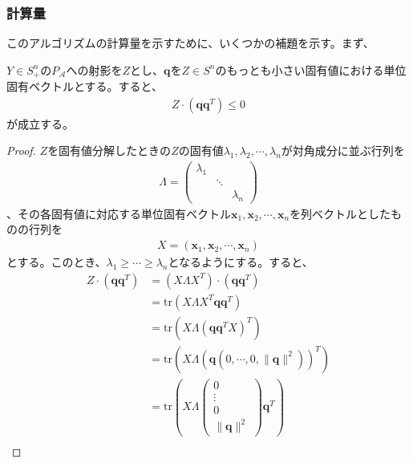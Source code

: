 \subsubsection{計算量}
このアルゴリズムの計算量を示すために、いくつかの補題を示す。まず、
\begin{lemma} \label{NegativeInnerProduct}
  $Y \in S_+^n$の$P_\mathcal{A}$への射影を$Z$とし、$\mathbf{q}$を$Z \in S^n$のもっとも小さい固有値における単位固有ベクトルとする。すると、
  \begin{align*}
    Z \cdot (\mathbf{q} \mathbf{q}^T) \leq 0
  \end{align*}
  が成立する。
\end{lemma}
\begin{proof}
  $Z$を固有値分解したときの$Z$の固有値$\lambda_1, \lambda_2, \cdots, \lambda_n$が対角成分に並ぶ行列を
  \begin{align*}
    \Lambda = \left(
                \begin{array}{ccc}
                  \lambda_1 &        & \\
                            & \ddots & \\
                            &        & \lambda_n
                \end{array}
              \right)
  \end{align*}
  、その各固有値に対応する単位固有ベクトル$\mathbf{x}_1, \mathbf{x}_2, \cdots, \mathbf{x}_n$を列ベクトルとしたものの行列を
  \begin{align*}
    X = \left(\mathbf{x}_1, \mathbf{x}_2, \cdots, \mathbf{x}_n\right)
  \end{align*}
  とする。このとき、$\lambda_1 \geq \cdots \geq \lambda_n$となるようにする。すると、
  \begin{align*}
    Z \cdot (\mathbf{q} \mathbf{q}^T) & = (X \Lambda X^T) \cdot (\mathbf{q} \mathbf{q}^T) \\
                                      & = \mathrm{tr}(X \Lambda X^T \mathbf{q} \mathbf{q}^T) \\
                                      & = \mathrm{tr}\left(X \Lambda \left(\mathbf{q} \mathbf{q}^T X\right)^T\right) \\
                                      & = \mathrm{tr}\left(X \Lambda \left(\mathbf{q} \left(0, \cdots, 0, \|\mathbf{q}\|^2\right)\right)^T\right) \\
                                      & = \mathrm{tr}\left(X \Lambda \left(\begin{array}{c} 0 \\ \vdots \\ 0 \\ \|\mathbf{q}\|^2 \end{array}\right) \mathbf{q}^T\right) \\

\end{align*}
\end{proof}
